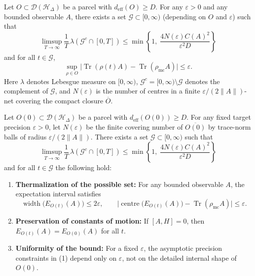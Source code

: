 \documentclass[10pt,a4paper]{amsart}
\begin{document}
\begin{lemma}
\label{lem:uniform}
Let \(O \subset \mathcal D(\mathcal H_\Delta)\) be a parcel with \(d_{\mathrm{eff}}(O)\ge D\). For any \(\varepsilon>0\) and any bounded observable \(A\), there exists a set \(\mathcal{G}\subset[0,\infty)\) (depending on \(O\) and \(\varepsilon\)) such that
\[
\limsup_{T\to\infty}\frac{1}{T}\,\lambda(\mathcal{G}^c\cap[0,T]) \le \min\left\{1,\; \frac{4N(\varepsilon) C(A)^2}{\varepsilon^2 D}\right\}
\]
and for all \(t\in\mathcal{G}\),
\[
\sup_{\rho\in O} \bigl|\operatorname{Tr}(\rho(t)A)-\operatorname{Tr}(\rho_{\mathrm{mc}}A)\bigr| \le \varepsilon.
\]
Here \(\lambda\) denotes Lebesgue measure on \([0,\infty)\),
\(\mathcal G^c=[0,\infty)\setminus\mathcal G\) denotes the complement
of \(\mathcal G\), and \(N(\varepsilon)\) is the number of centres in a
finite \(\varepsilon/(2\|A\|)\)-net covering the compact closure
\(\overline O\).
\end{lemma}

\begin{theorem}
\label{thm:basic}
Let $O(0) \subset \mathcal D(\mathcal H_\Delta)$ be a parcel with \(d_{\mathrm{eff}}(O(0))\ge D\). For any fixed target precision \(\varepsilon>0\), let \(N(\varepsilon)\) be the finite covering number of \(\overline{O(0)}\) by trace-norm balls of radius \(\varepsilon/(2\|A\|)\). There exists a set \(\mathcal{G}\subset[0,\infty)\) such that
\[
\limsup_{T\to\infty}\frac{1}{T}\,\lambda(\mathcal{G}^c\cap[0,T]) \le \min\left\{1,\; \frac{4N(\varepsilon)C(A)^2}{\varepsilon^2 D}\right\}
\]
and for all \(t\in\mathcal{G}\) the following hold:

\begin{enumerate}
    \item \textbf{Thermalization of the possible set:} For any bounded observable \(A\), the expectation interval satisfies
    \[
    \operatorname{width}\bigl(E_{O(t)}(A)\bigr) \le 2\varepsilon, \qquad
    \bigl|\operatorname{centre}\bigl(E_{O(t)}(A)\bigr)-\operatorname{Tr}(\rho_{\mathrm{mc}}A)\bigr| \le \varepsilon.
    \]
    \item \textbf{Preservation of constants of motion:} If \([A,H]=0\), then \(E_{O(t)}(A)=E_{O(0)}(A)\) for all \(t\).
    \item \textbf{Uniformity of the bound:} For a fixed \(\varepsilon\), the asymptotic precision constraints in (1) depend only on \(\varepsilon\), not on the detailed internal shape of \(O(0)\).
\end{enumerate}
\end{theorem}
\end{document}
